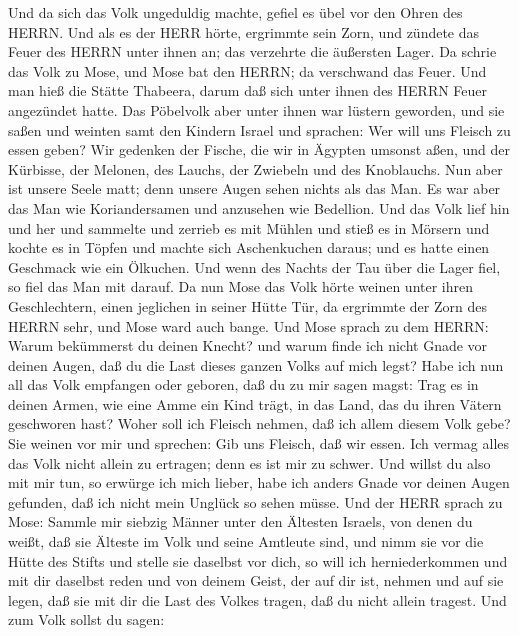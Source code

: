  Und da sich das Volk ungeduldig machte, gefiel es übel vor
den Ohren des HERRN. Und als es der HERR hörte, ergrimmte sein Zorn, und
zündete das Feuer des HERRN unter ihnen an; das verzehrte die äußersten
Lager.  Da schrie das Volk zu Mose, und Mose bat den HERRN;
da verschwand das Feuer.  Und man hieß die Stätte Thabeera,
darum daß sich unter ihnen des HERRN Feuer angezündet hatte.
 Das Pöbelvolk aber unter ihnen war lüstern geworden, und
sie saßen und weinten samt den Kindern Israel und sprachen: Wer will uns
Fleisch zu essen geben?  Wir gedenken der Fische, die wir in
Ägypten umsonst aßen, und der Kürbisse, der Melonen, des Lauchs, der
Zwiebeln und des Knoblauchs.  Nun aber ist unsere Seele
matt; denn unsere Augen sehen nichts als das Man.  Es war
aber das Man wie Koriandersamen und anzusehen wie Bedellion.
 Und das Volk lief hin und her und sammelte und zerrieb es
mit Mühlen und stieß es in Mörsern und kochte es in Töpfen und machte
sich Aschenkuchen daraus; und es hatte einen Geschmack wie ein Ölkuchen.
 Und wenn des Nachts der Tau über die Lager fiel, so fiel
das Man mit darauf.  Da nun Mose das Volk hörte weinen
unter ihren Geschlechtern, einen jeglichen in seiner Hütte Tür, da
ergrimmte der Zorn des HERRN sehr, und Mose ward auch bange.
 Und Mose sprach zu dem HERRN: Warum bekümmerst du deinen
Knecht? und warum finde ich nicht Gnade vor deinen Augen, daß du die
Last dieses ganzen Volks auf mich legst?  Habe ich nun all
das Volk empfangen oder geboren, daß du zu mir sagen magst: Trag es in
deinen Armen, wie eine Amme ein Kind trägt, in das Land, das du ihren
Vätern geschworen hast?  Woher soll ich Fleisch nehmen, daß
ich allem diesem Volk gebe? Sie weinen vor mir und sprechen: Gib uns
Fleisch, daß wir essen.  Ich vermag alles das Volk nicht
allein zu ertragen; denn es ist mir zu schwer.  Und willst
du also mit mir tun, so erwürge ich mich lieber, habe ich anders Gnade
vor deinen Augen gefunden, daß ich nicht mein Unglück so sehen müsse.
 Und der HERR sprach zu Mose: Sammle mir siebzig Männer
unter den Ältesten Israels, von denen du weißt, daß sie Älteste im Volk
und seine Amtleute sind, und nimm sie vor die Hütte des Stifts und
stelle sie daselbst vor dich,  so will ich herniederkommen
und mit dir daselbst reden und von deinem Geist, der auf dir ist, nehmen
und auf sie legen, daß sie mit dir die Last des Volkes tragen, daß du
nicht allein tragest.  Und zum Volk sollst du sagen:
